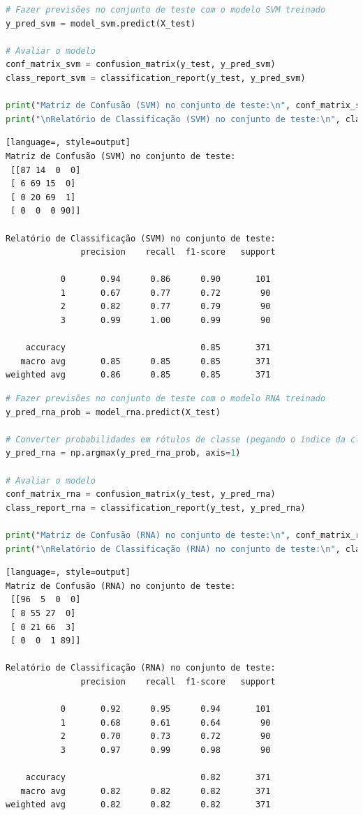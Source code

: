 \begin{lstlisting}[language=Python, style=input]
# Fazer previsões no conjunto de teste com o modelo SVM treinado
y_pred_svm = model_svm.predict(X_test)

# Avaliar o modelo
conf_matrix_svm = confusion_matrix(y_test, y_pred_svm)
class_report_svm = classification_report(y_test, y_pred_svm)

print("Matriz de Confusão (SVM) no conjunto de teste:\n", conf_matrix_svm)
print("\nRelatório de Classificação (SVM) no conjunto de teste:\n", class_report_svm)
\end{lstlisting}
\begin{lstlisting}[language=, style=output]
Matriz de Confusão (SVM) no conjunto de teste:
 [[87 14  0  0]
 [ 6 69 15  0]
 [ 0 20 69  1]
 [ 0  0  0 90]]

Relatório de Classificação (SVM) no conjunto de teste:
               precision    recall  f1-score   support

           0       0.94      0.86      0.90       101
           1       0.67      0.77      0.72        90
           2       0.82      0.77      0.79        90
           3       0.99      1.00      0.99        90

    accuracy                           0.85       371
   macro avg       0.85      0.85      0.85       371
weighted avg       0.86      0.85      0.85       371
\end{lstlisting}

\begin{lstlisting}[language=Python, style=input]
# Fazer previsões no conjunto de teste com o modelo RNA treinado
y_pred_rna_prob = model_rna.predict(X_test)

# Converter probabilidades em rótulos de classe (pegando o índice da classe com maior probabilidade)
y_pred_rna = np.argmax(y_pred_rna_prob, axis=1)

# Avaliar o modelo
conf_matrix_rna = confusion_matrix(y_test, y_pred_rna)
class_report_rna = classification_report(y_test, y_pred_rna)

print("Matriz de Confusão (RNA) no conjunto de teste:\n", conf_matrix_rna)
print("\nRelatório de Classificação (RNA) no conjunto de teste:\n", class_report_rna)
\end{lstlisting}
\begin{lstlisting}[language=, style=output]
Matriz de Confusão (RNA) no conjunto de teste:
 [[96  5  0  0]
 [ 8 55 27  0]
 [ 0 21 66  3]
 [ 0  0  1 89]]

Relatório de Classificação (RNA) no conjunto de teste:
               precision    recall  f1-score   support

           0       0.92      0.95      0.94       101
           1       0.68      0.61      0.64        90
           2       0.70      0.73      0.72        90
           3       0.97      0.99      0.98        90

    accuracy                           0.82       371
   macro avg       0.82      0.82      0.82       371
weighted avg       0.82      0.82      0.82       371
\end{lstlisting}

